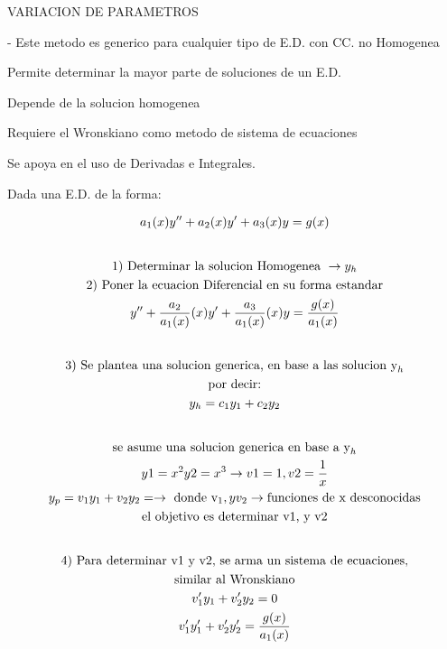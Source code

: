 \documentclass{article}
\begin{document}
VARIACION DE PARAMETROS

- Este metodo es generico para cualquier tipo de E.D. con CC. no Homogenea

Permite determinar la mayor parte de soluciones de un E.D. 

Depende de la solucion homogenea

Requiere el Wronskiano como metodo de sistema de ecuaciones

Se apoya en el uso de Derivadas e Integrales.

Dada una E.D. de la forma:




\begin{gather*}
a_{1}(x)y''+a_{2}(x)y'+a_{3}(x)y = g(x) \\
\vspace{0.5em} \\
1)\text{ Determinar la solucion Homogenea } \rightarrow  y_{h} \\
2)\text{ Poner la ecuacion Diferencial en su forma estandar} \\
y''+\frac{a_{2}}{a_{1}(x)}(x)y'+\frac{a_{3}}{a_{1}(x)}(x)y =\frac{g(x)}{a_{1}(x)} \\
\vspace{0.5em} \\
3)\text{ Se plantea una solucion generica, en base a las solucion y}_{h} \\
\text{por decir:} \\
y_{h} = c_{1}y_{1}+c_{2}y_{2} \\
\vspace{0.5em} \\
\text{se asume una solucion generica en base a y}_{h} \\
y1 = x^{2}  y2 = x^{3}   \rightarrow  v1=1, v2 =\frac{1}{x} \\
y_{p} = v_{1}y_{1}+v_{2}y_{2} =   \rightarrow \text{ donde v}_{1}, y v_{2}  \rightarrow \text{funciones de x desconocidas} \\
\text{el objetivo es determinar v1, y v2} \\
\vspace{0.5em} \\
4)\text{ Para determinar v1 y v2, se arma un sistema de ecuaciones,} \\
\text{similar al Wronskiano} \\
v_{1}'y_{1}+v_{2}'y_{2} = 0 \\
v_{1}'y_{1}'+v_{2}'y_{2}' =\frac{g(x)}{a_{1}(x)} \\
\vspace{0.5em} \\

\end{gather*}
\end{document}
